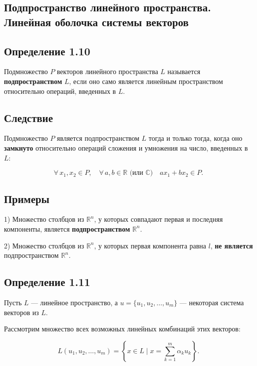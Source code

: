 {
\subsection{Подпространство линейного пространства. Линейная оболочка системы векторов}

\subsection*{Определение 1.10}

Подмножество \( P \) векторов линейного пространства \( L \) называется \textbf{подпространством} \( L \), если оно само является линейным пространством относительно операций, введенных в \( L \).

\subsection*{Следствие}

Подмножество \( P \) является подпространством \( L \) тогда и только тогда, когда оно \textbf{замкнуто} относительно операций сложения и умножения на число, введенных в \( L \):

\[
\forall \, x_1, x_2 \in P, \quad \forall \, a, b \in \mathbb{R} \text{ (или } \mathbb{C} \text{)} \quad ax_1 + bx_2 \in P.
\]

\subsection*{Примеры}

1) Множество столбцов из \( \mathbb{R}^n \), у которых совпадают первая и последняя компоненты, является \textbf{подпространством} \( \mathbb{R}^n \).

2) Множество столбцов из \( \mathbb{R}^n \), у которых первая компонента равна \( l \), \textbf{не является} подпространством \( \mathbb{R}^n \).

\subsection*{Определение 1.11}

Пусть \( L \) — линейное пространство, а \( u = \{ u_1, u_2, \dots, u_m \} \) — некоторая система векторов из \( L \). 

Рассмотрим множество всех возможных линейных комбинаций этих векторов:

\[
L (u_1, u_2, \dots, u_m) = \left\{ x \in L \mid x = \sum_{k=1}^{m} \alpha_k u_k \right\}.
\]


}
